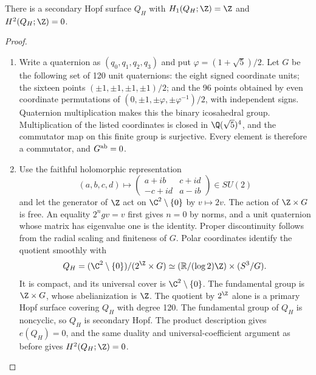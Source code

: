 \begin{proposition}\hypertarget{tag-01F9}{}\label{cdp:st:C.3.3}


There is a secondary Hopf surface $Q_H$ with
$H_1(Q_H;\Z)=\Z$ and $H^2(Q_H;\Z)=0$.
\end{proposition}


\begin{proof}

\begin{enumerate}[leftmargin=*]
\item Write a quaternion as $(q_0,q_1,q_2,q_3)$ and put
$\varphi=(1+\sqrt5)/2$. Let $G$ be the following set of 120 unit
quaternions: the eight signed coordinate units; the sixteen points
$(\pm1,\pm1,\pm1,\pm1)/2$; and the 96 points obtained by even
coordinate permutations of
$(0,\pm1,\pm\varphi,\pm\varphi^{-1})/2$, with independent signs.
Quaternion multiplication makes this the binary icosahedral group.
Multiplication of the listed coordinates is closed in $\Q(\sqrt5)^4$,
and the commutator map on this finite group is surjective.
Every element is therefore a commutator, and $G^{\rm ab}=0$.

\item Use the faithful holomorphic representation
\[
(a,b,c,d)\longmapsto
\begin{pmatrix}a+ib&c+id\\-c+id&a-ib\end{pmatrix}\in SU(2)
\]
and let the generator of $\Z$ act on $\C^2\setminus\{0\}$ by
$v\mapsto2v$. The action of $\Z\times G$ is free. An equality
$2^ngv=v$ first gives $n=0$ by norms, and a unit quaternion whose
matrix has eigenvalue one is the identity. Proper discontinuity
follows from the radial scaling and finiteness of $G$.
Polar coordinates identify the quotient smoothly with
\[
Q_H=(\C^2\setminus\{0\})/(2^{\Z}\times G)
\simeq (\mathbb R/(\log2)\Z)\times(S^3/G).
\]
It is compact, and its universal cover is $\C^2\setminus\{0\}$.
The fundamental group is $\Z\times G$, whose abelianization is
$\Z$. The quotient by $2^{\Z}$ alone is a primary Hopf surface
covering $Q_H$ with degree 120. The fundamental group of $Q_H$ is
noncyclic, so $Q_H$ is secondary Hopf. The product description gives
$e(Q_H)=0$, and the same duality and universal-coefficient argument
as before gives $H^2(Q_H;\Z)=0$.

\end{enumerate}
\end{proof}